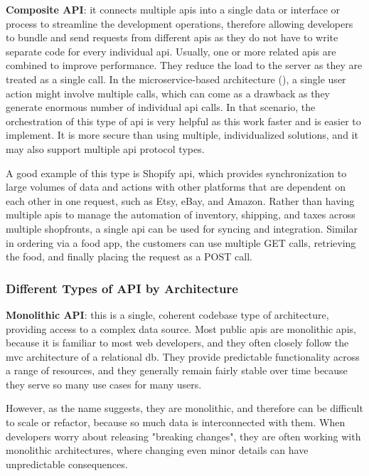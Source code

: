 \begin{multicols}{2}
      \textbf{Composite API}: it connects multiple \acrshort{api}s into a single data or interface or process to
      streamline the development operations, therefore allowing developers to bundle and send requests from different
      \acrshort{api}s as they do not have to write separate code for every individual \acrshort{api}. Usually,
      one or more related \acrshort{api}s are combined to improve performance. They reduce the load to the server
      as they are treated as a single call. In the microservice-based architecture
      (\textit{}), a single user action might involve multiple calls, which can come as
      a drawback as they generate enormous number of individual \acrshort{api} calls. In that scenario, the orchestration
      of this type of \acrshort{api} is very helpful as this work faster and is easier to implement. It is more secure
      than using multiple, individualized solutions, and it may also support multiple \acrshort{api} protocol types.

      A good example of this type is Shopify \acrshort{api}, which provides synchronization to large volumes of data and
      actions with other platforms that are dependent on each other in one request, such as Etsy, eBay, and Amazon. Rather
      than having multiple \acrshort{api}s to manage the automation of inventory, shipping, and taxes across multiple shopfronts,
      a single \acrshort{api} can be used for syncing and integration. Similar in ordering via a food app, the customers can
      use multiple GET calls, retrieving the food, and finally placing the request as a POST call.
      \subsubsection{Different Types of API by Architecture}
      \textbf{Monolithic API}: this is a single, coherent codebase type of architecture, providing access to a complex data
      source. Most public \acrshort{api}s are monolithic \acrshort{api}s, because it is familiar to most web developers, and
      they often closely follow the \acrshort{mvc} architecture of a relational \acrshort{db}. They provide predictable
      functionality across a range of resources, and they generally remain fairly stable over time because they serve so
      many use cases for many users.

      However, as the name suggests, they are monolithic, and therefore can be difficult to scale or refactor, because so much
      data is interconnected with them. When developers worry about releasing "breaking changes", they are often working with
      monolithic architectures, where changing even minor details can have unpredictable consequences.


\end{multicols}
